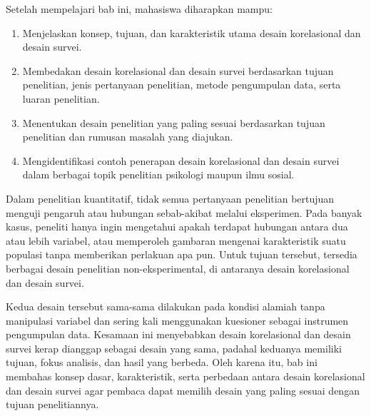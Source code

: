 \documentclass[
  indonesian,
  letterpaper,
  DIV=11,
  numbers=noendperiod]{scrreprt}
\providecommand{\tightlist}{%
  \setlength{\itemsep}{0pt}\setlength{\parskip}{0pt}}
\begin{document}
\begin{tcolorbox}[enhanced jigsaw, colframe=quarto-callout-note-color-frame, toptitle=1mm, breakable, leftrule=.75mm, arc=.35mm, toprule=.15mm, colback=white, colbacktitle=quarto-callout-note-color!10!white, bottomtitle=1mm, bottomrule=.15mm, titlerule=0mm, title=\textcolor{quarto-callout-note-color}{\faInfo}\hspace{0.5em}{Capaian Pembelajaran}, coltitle=black, left=2mm, opacitybacktitle=0.6, opacityback=0, rightrule=.15mm]

Setelah mempelajari bab ini, mahasiswa diharapkan mampu:

\begin{enumerate}
\def\labelenumi{\arabic{enumi}.}
\tightlist
\item
  Menjelaskan konsep, tujuan, dan karakteristik utama desain
  korelasional dan desain survei.
\item
  Membedakan desain korelasional dan desain survei berdasarkan tujuan
  penelitian, jenis pertanyaan penelitian, metode pengumpulan data,
  serta luaran penelitian.
\item
  Menentukan desain penelitian yang paling sesuai berdasarkan tujuan
  penelitian dan rumusan masalah yang diajukan.
\item
  Mengidentifikasi contoh penerapan desain korelasional dan desain
  survei dalam berbagai topik penelitian psikologi maupun ilmu sosial.
\end{enumerate}

\end{tcolorbox}

Dalam penelitian kuantitatif, tidak semua pertanyaan penelitian
bertujuan menguji pengaruh atau hubungan sebab-akibat melalui
eksperimen. Pada banyak kasus, peneliti hanya ingin mengetahui apakah
terdapat hubungan antara dua atau lebih variabel, atau memperoleh
gambaran mengenai karakteristik suatu populasi tanpa memberikan
perlakuan apa pun. Untuk tujuan tersebut, tersedia berbagai desain
penelitian non-eksperimental, di antaranya desain korelasional dan
desain survei.

Kedua desain tersebut sama-sama dilakukan pada kondisi alamiah tanpa
manipulasi variabel dan sering kali menggunakan kuesioner sebagai
instrumen pengumpulan data. Kesamaan ini menyebabkan desain korelasional
dan desain survei kerap dianggap sebagai desain yang sama, padahal
keduanya memiliki tujuan, fokus analisis, dan hasil yang berbeda. Oleh
karena itu, bab ini membahas konsep dasar, karakteristik, serta
perbedaan antara desain korelasional dan desain survei agar pembaca
dapat memilih desain yang paling sesuai dengan tujuan penelitiannya.
\end{document}

